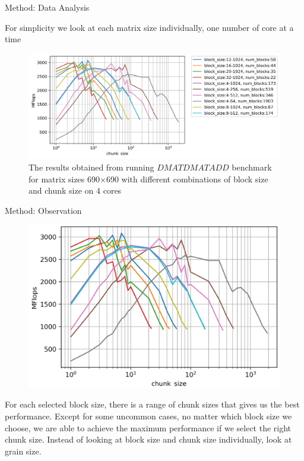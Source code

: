 \documentclass[10pt]{beamer}
\begin{document}
\begin{frame}{Method: Data Analysis}
	\begin{outline}
		\1For simplicity we look at each matrix size individually, one number of core at a time 
		
		
		\begin{figure}
			\includegraphics[width=0.9\linewidth]{images/fig5.png}	
			\caption{The results obtained from running $DMATDMATADD$ benchmark for matrix sizes 690$\times$690 with different combinations of block size and chunk size on $4$ cores}	
		\end{figure}
	\end{outline}
\end{frame}


\begin{frame}{Method: Observation}
	\begin{outline}
		\begin{figure}
			\includegraphics[scale=0.2]{images/fig5_cropped.png}			
		\end{figure}
		\1For each selected block size, there is a range of chunk sizes that gives us the best performance. 
		\1Except for some uncommon cases, no matter which block size we choose, we are able to achieve the maximum performance if we select the right chunk size.  
		\pause
		\1Instead of looking at block size and chunk size individually, look at grain size.
	\end{outline}
\end{frame}
\end{document}
